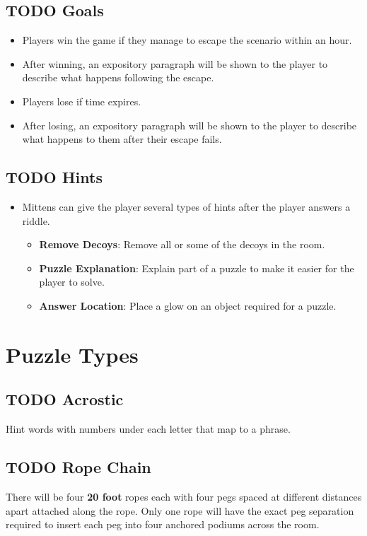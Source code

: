 \documentclass[11pt]{article}
\begin{document}
\subsection{{\bfseries\sffamily TODO} Goals}
\label{sec:org2d08b10}
\begin{itemize}
\item Players win the game if they manage to escape the scenario within an hour.
\item After winning, an expository paragraph will be shown to the player to describe what happens following the escape.
\item Players lose if time expires.
\item After losing, an expository paragraph will be shown to the player to describe what happens to them after their escape fails.
\end{itemize}

\subsection{{\bfseries\sffamily TODO} Hints}
\label{sec:org99b8d17}
\begin{itemize}
\item Mittens can give the player several types of hints after the player answers a riddle.
\begin{itemize}
\item \textbf{Remove Decoys}: Remove all or some of the decoys in the room.
\item \textbf{Puzzle Explanation}: Explain part of a puzzle to make it easier for the player to solve.
\item \textbf{Answer Location}: Place a glow on an object required for a puzzle.
\end{itemize}
\end{itemize}

\section{Puzzle Types}
\label{sec:orge7e6ee3}
\subsection{{\bfseries\sffamily TODO} Acrostic}
\label{sec:org7482032}
Hint words with numbers under each letter that map to a phrase.

\subsection{{\bfseries\sffamily TODO} Rope Chain}
\label{sec:org4c9f4f1}
There will be four \textbf{20 foot} ropes each with four pegs spaced at different distances apart attached along the rope. Only one rope will have the exact peg separation required to insert each peg into four anchored podiums across the room.
\end{document}

